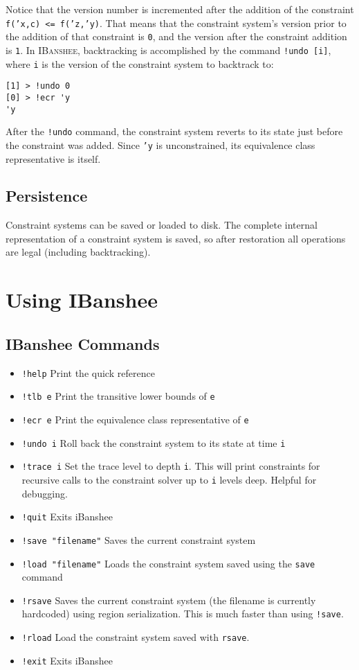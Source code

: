 \documentclass[10pt]{article}
\newcommand{\ibanshee}{\textsc{IBanshee}}
\begin{document}
Notice that the version number is incremented after the addition of
the constraint \texttt{f('x,c) <= f('z,'y)}. That means that the
constraint system's version prior to the addition of that constraint
is \texttt{0}, and the version after the constraint addition is
\texttt{1}. In \ibanshee{}, backtracking is accomplished by the
command \texttt{!undo [i]}, where \texttt{i} is the version of the
constraint system to backtrack to:

\begin{verbatim}
[1] > !undo 0
[0] > !ecr 'y
'y
\end{verbatim}

After the \texttt{!undo} command, the constraint system reverts to its
state just before the constraint was added. Since \texttt{'y} is
unconstrained, its equivalence class representative is itself.

\subsection{Persistence}

Constraint systems can be saved or loaded to disk. The complete
internal representation of a constraint system is saved, so after
restoration all operations are legal (including backtracking).

\section{Using IBanshee}
\label{sec-ibanshee}

\subsection{IBanshee Commands}

\begin{itemize}
\item \texttt{!help} Print the quick reference
\item \texttt{!tlb e} Print the transitive lower bounds of \texttt{e}
\item \texttt{!ecr e} Print the equivalence class representative of \texttt{e}
\item \texttt{!undo i} Roll back the constraint system to its state at time \texttt{i}
\item \texttt{!trace i} Set the trace level to depth \texttt{i}. This will print constraints for recursive calls to the constraint solver up to \texttt{i} levels deep. Helpful for debugging.
\item \texttt{!quit} Exits iBanshee
\item \texttt{!save "filename"} Saves the current constraint system
\item \texttt{!load "filename"} Loads the constraint system saved using the \texttt{save} command
\item \texttt{!rsave} Saves the current constraint system (the filename is currently hardcoded) using region serialization. This is much faster than using \texttt{!save}.
\item \texttt{!rload} Load the constraint system saved with
  \texttt{rsave}.
\item \texttt{!exit} Exits iBanshee
\end{itemize}
\end{document}
